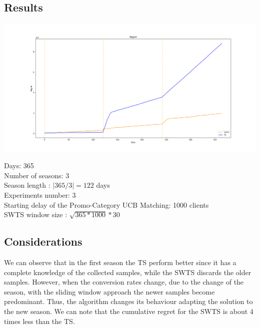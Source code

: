 \subsection*{Results}
\begin{center}
	\includegraphics[scale=0.30]{Images/n7}
\end{center}
Days: 365\\
Number of seasons: 3 \\
Season length : $|365/3| = 122 $ days\\
Experiments number: 3 \\
Starting delay of the Promo-Category UCB Matching: 1000 clients\\
SWTS window size : $\sqrt{365 * 1000} * 30$\\
\subsection*{Considerations}
We can observe that in the first season the TS perform better since it has a complete knowledge of the collected samples, while the SWTS discards the older samples. However, when the conversion rates change, due to the change of the season, with the sliding window approach the newer samples become predominant. Thus, the algorithm changes its behaviour adapting the solution to the new season. We can note that the cumulative regret for the SWTS is about 4 times less than the TS. 